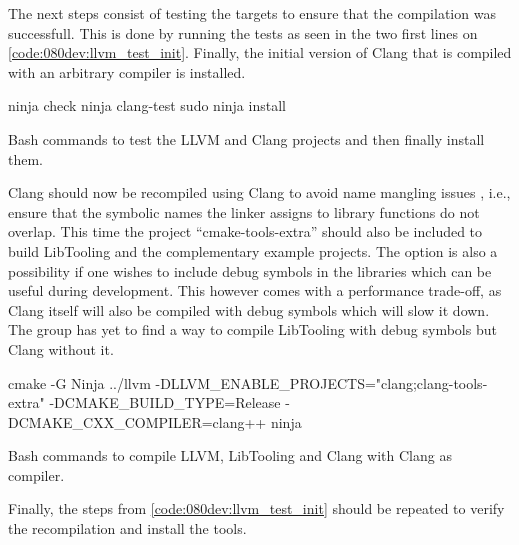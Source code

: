 The next steps consist of testing the targets to ensure that the compilation was successfull. This is done by running the tests as seen in the two first lines on \cref{code:080dev:llvm_test_init}. Finally, the initial version of Clang that is compiled with an arbitrary compiler is installed.

\begin{listing}[H]
    \begin{bashcode}
ninja check
ninja clang-test
sudo ninja install
    \end{bashcode}
    \caption{Bash commands to test the LLVM and Clang projects and then finally install them.}
    \label{code:080dev:llvm_test_init}
\end{listing}

Clang should now be recompiled using Clang to avoid name mangling issues \cite{ibmIBMDocumentation2021}, i.e., ensure that the symbolic names the linker assigns to library functions do not overlap. This time the project ``cmake-tools-extra'' should also be included to build LibTooling and the complementary example projects.
The option  is also a possibility if one wishes to include debug symbols in the libraries which can be useful during development. This however comes with a performance trade-off, as Clang itself will also be compiled with debug symbols which will slow it down.
The group has yet to find a way to compile LibTooling with debug symbols but Clang without it.

\begin{listing}[H]
    \begin{bashcode}
cmake -G Ninja ../llvm -DLLVM_ENABLE_PROJECTS="clang;clang-tools-extra" -DCMAKE_BUILD_TYPE=Release -DCMAKE_CXX_COMPILER=clang++
ninja
    \end{bashcode}
    \caption{Bash commands to compile LLVM, LibTooling and Clang with Clang as compiler.}
    \label{code:080dev:llvm_compile_final}
\end{listing}

Finally, the steps from \cref{code:080dev:llvm_test_init} should be repeated to verify the recompilation and install the tools.